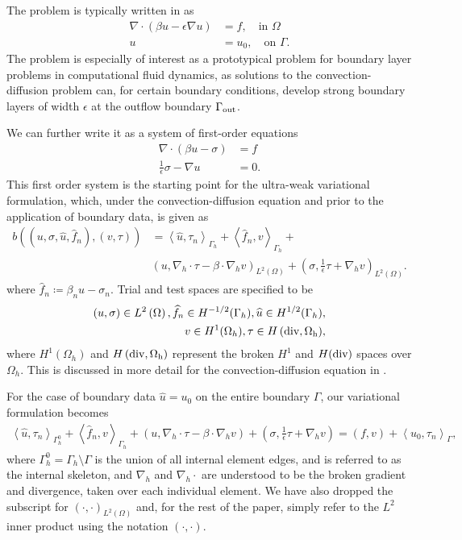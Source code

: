 \documentclass[11pt,onecolumn]{scrartcl}
\newcommand{\LRp}[1]{\left( #1 \right)}
\newcommand{\LRa}[1]{\left\langle #1 \right\rangle}
\newcommand{\Grad} {\ensuremath{\nabla}}
\newcommand{\uh}{\widehat{u}}
\newcommand{\fnh}{\widehat{f}_n}
\renewcommand{\L}{L^2\LRp{\Omega}}
\newcommand{\Gh}{\Gamma_h}
\newcommand{\Oh}{\Omega_h}
\newcommand{\grad}{\nabla}
\renewcommand{\div}{\grad \cdot}
\begin{document}
The problem is typically written in as
\begin{align*}
\div\LRp{\beta u - \epsilon \grad u} &= f, \quad \text{in } \Omega \\
u &= u_{0}, \quad \text{on } \Gamma.
\end{align*}
The problem is especially of interest as a prototypical problem for boundary layer problems in computational fluid dynamics, as solutions to the convection-diffusion problem can, for certain boundary conditions, develop strong boundary layers of width $\epsilon$ at the outflow boundary $\Gamma_{\rm out}$.    

We can further write it as a system of first-order equations
\begin{align*}
\div\LRp{\beta u - \sigma} &= f\\
\frac{1}{\epsilon}\sigma - \grad u &= 0.
\end{align*}
This first order system is the starting point for the ultra-weak variational formulation, which, under the convection-diffusion equation and prior to the application of boundary data, is given as 
\begin{align*}
b\LRp{\LRp{u,\sigma, \uh, \fnh}, \LRp{v,\tau}} &=\LRa{\uh,\tau_n}_{\Gh} + \LRa{\fnh,v}_{\Gh} + \\ & \LRp{u, \Grad_h\cdot \tau - \beta\cdot \Grad_h v}_{\L} + \LRp{\sigma, \frac{1}{\epsilon}\tau + \Grad_h v}_{\L}.
\end{align*}
where $\fnh \coloneqq \beta_n u - \sigma_n$.  Trial and test spaces are specified to be 
\begin{align*}
\LRp{u,\sigma} \in \L, \fnh \in H^{-1/2}(\Gh), \uh \in H^{1/2}(\Gh)&,\\ 
v \in H^1(\Oh), \tau \in H\LRp{\rm div, \Oh}&,
\end{align*}
where $H^1(\Oh)$ and $H\LRp{\rm div, \Oh}$ represent the broken $H^1$ and $H(\rm div)$ spaces over $\Oh$.  This is discussed in more detail for the convection-diffusion equation in \cite{DPGrobustness, ChanHeuerBui-ThanhDemkowicz12}.

For the case of boundary data $\uh = u_0$ on the entire boundary $\Gamma$, our variational formulation becomes
\begin{align*}
\LRa{\uh,\tau_n}_{\Gh^0} + \LRa{\fnh,v}_{\Gh} + \LRp{u, \Grad_h\cdot \tau - \beta\cdot \Grad_h v} + \LRp{\sigma, \frac{1}{\epsilon}\tau + \Grad_h v} = \LRp{f,v} + \LRa{u_0,\tau_n}_{\Gamma}, 
\end{align*}
where $\Gh^0 = \Gh\setminus \Gamma$ is the union of all internal element edges, and is referred to as the internal skeleton, and $\Grad_h$ and $\Grad_h\cdot$ are understood to be the broken gradient and divergence, taken over each individual element.  We have also dropped the subscript for $\LRp{\cdot,\cdot}_{L^2(\Omega)}$ and, for the rest of the paper, simply refer to the $L^2$ inner product using the notation $\LRp{\cdot,\cdot}$.  
\end{document}
